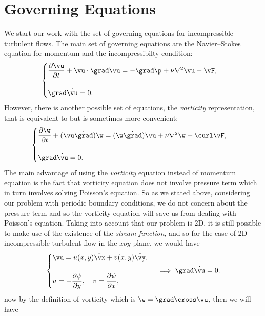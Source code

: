 \documentclass[12pt]{article}
\def\v{\bm}
\def\div{\grad\dot}
\def\lap{{\nabla}^2}
\def\vw{{\v\w}}
\def\hyperindex#1{\index{#1}\hypertarget{#1}}
\def\In#1{\hyperindex{#1}{\emph{#1}}}
\begin{document}
\section{Governing Equations}
We start our work with the set of governing equations for incompressible
turbulent flows. The main set of governing equations are the Navier--Stokes equation for momentum and the incompressibilty condition:
\begin{equation}
\begin{cases}
\dfrac{\partial \vu}{\partial t} + \vu\cdot\grad\vu = -\grad \p + \nu\lap\vu + \vF,\\
\\
\div \vu=0.\label{NS}
\end{cases}
\end{equation}
However, there is another possible set of equations,
the \In{vorticity} representation, that is equivalent to  but is
sometimes more convenient:
\begin{equation}\label{vorticity}
\begin{cases}
\dfrac{\partial{\vw}}{\partial t} + (\vu\dot\grad)\vw=(\vw\dot\grad)\vu + \nu\lap\vw + \curl\vF,\\
\\
\div \vu=0.
\end{cases}
\end{equation}
The main advantage of using the \emph{vorticity} equation instead of momentum equation is the fact that vorticity equation does not involve pressure term which in turn involves solving Poisson's equation. So as we stated above, considering our problem with periodic boundary conditions, we do not concern about the pressure term and so the vorticity equation will save us from dealing with Poisson's equation. Taking into account that our problem is 2D, it is still possible to make use of the existence of the
\emph{stream function}, and so for the case of 2D incompressible turbulent flow in the $xoy$ plane, we would have
\begin{equation}
\begin{cases}
\vu=u(x,y)\hat{\vx}+v(x,y)\hat{\vy}, \\
\hspace{3.5cm} 		\\
u=-\dfrac{\partial\psi}{\partial y},\quad v=\dfrac{\partial\psi}{\partial x}, \label{streamfunction}
\end{cases}\implies \div\vu=0.
\end{equation}
now by the definition of vorticity which is $\vw=\grad\cross\vu$, then we will have
\end{document}
